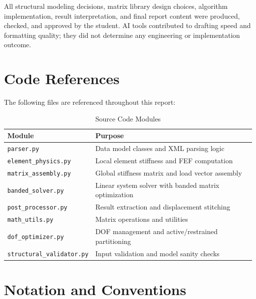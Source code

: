 \documentclass[12pt,a4paper]{article}
\begin{document}
All structural modeling decisions, matrix library design choices, algorithm implementation, result interpretation, and final report content were produced, checked, and approved by the student. AI tools contributed to drafting speed and formatting quality; they did not determine any engineering or implementation outcome.


\appendix

\section{Code References}

The following files are referenced throughout this report:

\begin{table}[H]
    \centering
    \caption{Source Code Modules}
    \label{tab:code_modules}
    \begin{tabular}{lp{}}
        \toprule
        \textbf{Module} & \textbf{Purpose} \\
        \midrule
        \texttt{parser.py} & Data model classes and XML parsing logic \\
        \texttt{element\_physics.py} & Local element stiffness and FEF computation \\
        \texttt{matrix\_assembly.py} & Global stiffness matrix and load vector assembly \\
        \texttt{banded\_solver.py} & Linear system solver with banded matrix optimization \\
        \texttt{post\_processor.py} & Result extraction and displacement stitching \\
        \texttt{math\_utils.py} & Matrix operations and utilities \\
        \texttt{dof\_optimizer.py} & DOF management and active/restrained partitioning \\
        \texttt{structural\_validator.py} & Input validation and model sanity checks \\
        \bottomrule
    \end{tabular}
\end{table}

\section{Notation and Conventions}
\end{document}

